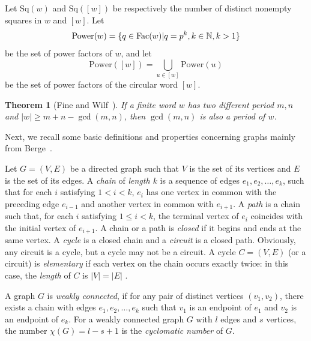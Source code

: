 \documentclass[runningheads,envcountsame,a4paper]{llncs}
\newtheorem{thm}{Theorem}
\newtheorem{exa}[thm]{Example}
\newtheorem{defn}[thm]{Definition}
\newcommand{\fac}{\hbox{\rm Fac}}
\newcommand{\pow}{\mathrm{Power}}
\newcommand{\sq}{\mathrm{Sq}}
\newcommand{\NN}{\mathbb{N}}
\begin{document}
Let $\sq(w)$ and $\sq([w])$ be respectively the number of distinct nonempty squares in $w$ and $[w]$. Let 
$$\pow(w) =\{q\in\fac(w)| q=p^k,k\in\NN,k>1\}$$ 
be the set of power factors of $w$, and let $$\pow([w]) =\bigcup_{u \in [w]}\pow(u)$$ 
be the set of power factors of the circular word $[w]$. 

\begin{thm}[{\rm Fine and Wilf~\cite{lothaire1}}]
\label{three}
If a finite word $w$ has two different period $m,n$ and $|w| \geq m+n-\gcd(m,n)$, then $\gcd(m,n)$ is also a period of $w$.
\end{thm}


Next, we recall some basic definitions and properties concerning graphs mainly from Berge~\cite{berge}.

Let $G=(V,E)$ be a directed graph such that $V$ is the set of its vertices and $E$ is the set of its edges.
A {\em chain} of {\em length $k$} is a sequence of edges $e_1,e_2,\ldots,e_k$, such that for each $i$ satisfying $1 < i < k$, $e_i$ has one vertex in common with the preceding edge $e_{i-1}$ and another vertex in common with $e_{i+1}$. A {\em path} is a chain such that, for each $i$ satisfying $1 \leq i < k$, the terminal vertex of $e_i$ coincides with the initial vertex of $e_{i+1}$. A chain or a path is {\em closed} if it begins and ends at the same vertex. A {\em cycle} is a closed chain and a {\em circuit} is a closed path. Obviously, any circuit is a cycle, but a cycle may not be a circuit. 
A cycle  $C=(V,E)$ (or a circuit) is  {\em elementary} if each vertex on the chain occurs exactly twice: in this case, the  {\em length} of $C$ is $|V|=|E|$ .   

A graph $G$ is {\em weakly connected}, if for any pair of distinct vertices $(v_1,v_2)$, there exists a chain with edges $e_1,e_2,\ldots,e_k$ such that $v_1$ is an endpoint of $e_1$ and $v_2$ is an endpoint of $e_k$. For a weakly connected graph $G$ with $l$ edges and $s$ vertices,  the number $\chi(G)=l-s+1$ is  the {\em cyclomatic number} of $G$.
\end{document}
